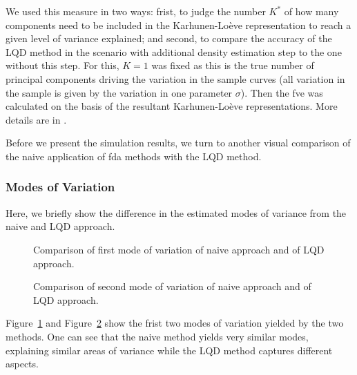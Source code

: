 


We used this measure in two ways: frist, to judge the number $K^*$ of how many components need to
be included in the Karhunen-Loève representation to reach a given level of variance explained;
and second, to compare the accuracy of the LQD method in the scenario with additional density estimation
step to the one without this step. For this, $K = 1$ was fixed as this is the true number
of principal components driving the variation in the sample curves (all variation in the sample is given
by the variation in one parameter $\sigma$). Then the fve was calculated on the basis
of the resultant Karhunen-Loève representations. More details are in \textcite{PetersenMüller2016}.

Before we present the simulation results, we turn to another visual comparison of
the naive application of fda methods with the LQD method.

\subsubsection{Modes of Variation}
\label{sec:mov_example}
Here, we briefly show the difference in the estimated modes of variance from the naive
and LQD approach.
\begin{figure}[h]
    \centering
    \resizebox{0.9\textwidth}{!}{}
    \caption[Comparison: first mode of variation]{Comparison of first mode of variation
    of naive approach and of LQD approach.}
    \label{fig:1st_modes}
\end{figure}
\begin{figure}[h]
    \centering
    \resizebox{0.9\textwidth}{!}{}
    \caption[Comparison: second mode of variation]{Comparison of second mode of variation
    of naive approach and of LQD approach.}
    \label{fig:2nd_modes}
\end{figure}
Figure~\ref{fig:1st_modes} and Figure~\ref{fig:2nd_modes} show the frist two modes of variation yielded
by the two methods. One can see that the naive method yields very similar modes, explaining
similar areas of variance while the LQD method captures different aspects.
